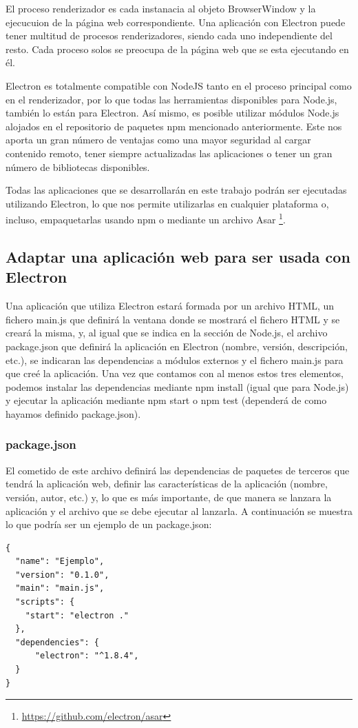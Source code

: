 El proceso renderizador es cada instanacia al objeto BrowserWindow y la ejecucuion de la página web correspondiente. Una aplicación con Electron puede tener multitud de procesos renderizadores, siendo cada uno independiente del resto. Cada proceso solos se preocupa de la página web que se esta ejecutando en él.

Electron es totalmente compatible con NodeJS tanto en el proceso principal como en el renderizador, por lo que todas las herramientas disponibles para Node.js, también lo están para Electron. Así mismo, es posible utilizar módulos Node.js alojados en el repositorio de paquetes npm mencionado anteriormente. Este nos aporta un gran número de ventajas como una mayor seguridad al cargar contenido remoto, tener siempre actualizadas las aplicaciones o tener un gran número de bibliotecas disponibles.

Todas las aplicaciones que se desarrollarán en este trabajo podrán ser ejecutadas utilizando Electron, lo que nos permite utilizarlas en cualquier plataforma o, incluso, empaquetarlas usando npm o mediante un archivo Asar \footnote{\url{https://github.com/electron/asar}}.

\subsection{Adaptar una aplicación web para ser usada con Electron}

Una aplicación que utiliza Electron estará formada por un archivo HTML, un fichero main.js que definirá la ventana donde se mostrará el fichero HTML y se creará la misma, y, al igual que se indica en la sección de Node.js, el archivo package.json que definirá la aplicación en Electron (nombre, versión, descripción, etc.), se indicaran las dependencias a módulos externos y el fichero main.js para que creé la aplicación. Una vez que contamos con al menos estos tres elementos, podemos instalar las dependencias mediante npm install (igual que para Node.js) y ejecutar la aplicación mediante npm start o npm test (dependerá de como hayamos definido package.json).

\subsubsection{package.json}
El cometido de este archivo definirá las dependencias de paquetes de terceros que tendrá la aplicación web, definir las características de la aplicación (nombre, versión, autor, etc.) y, lo que es más importante, de que manera se lanzara la aplicación y el archivo que se debe ejecutar al lanzarla. A continuación se muestra lo que podría ser un ejemplo de un package.json:
\begin{lstlisting}[frame=single]
{
  "name": "Ejemplo",
  "version": "0.1.0",
  "main": "main.js",
  "scripts": {
    "start": "electron ."
  },
  "dependencies": {
      "electron": "^1.8.4",
  }
}
\end{lstlisting}

